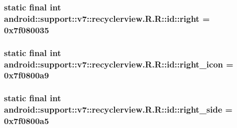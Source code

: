 \hypertarget{classandroid_1_1support_1_1v7_1_1recyclerview_1_1_r_1_1id_3fa19d79c2e0ee754eef3a352190d6f2}{
\subsubsection[{right}]{\setlength{\rightskip}{0pt plus 5cm}static final int android::support::v7::recyclerview.R.R::id::right = 0x7f080035}}
\label{classandroid_1_1support_1_1v7_1_1recyclerview_1_1_r_1_1id_3fa19d79c2e0ee754eef3a352190d6f2}


\hypertarget{classandroid_1_1support_1_1v7_1_1recyclerview_1_1_r_1_1id_1a16511ab429538d0b8607ad4e85c692}{
\subsubsection[{right\_\-icon}]{\setlength{\rightskip}{0pt plus 5cm}static final int android::support::v7::recyclerview.R.R::id::right\_\-icon = 0x7f0800a9}}
\label{classandroid_1_1support_1_1v7_1_1recyclerview_1_1_r_1_1id_1a16511ab429538d0b8607ad4e85c692}


\hypertarget{classandroid_1_1support_1_1v7_1_1recyclerview_1_1_r_1_1id_1bac6b3f55db627066feb11a085c1442}{
\subsubsection[{right\_\-side}]{\setlength{\rightskip}{0pt plus 5cm}static final int android::support::v7::recyclerview.R.R::id::right\_\-side = 0x7f0800a5}}
\label{classandroid_1_1support_1_1v7_1_1recyclerview_1_1_r_1_1id_1bac6b3f55db627066feb11a085c1442}


